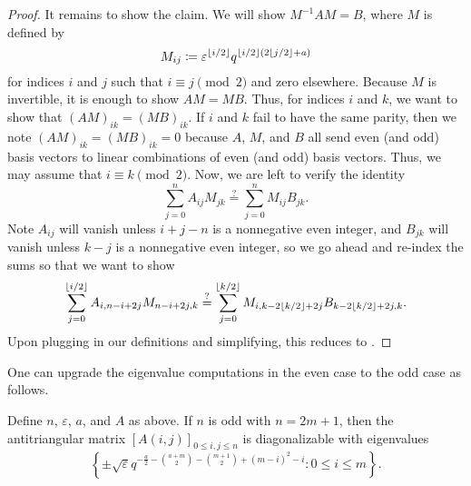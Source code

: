 \begin{proof}
    It remains to show the claim. We will show $M^{-1}AM=B$, where $M$ is defined by
    \[M_{ij}\coloneqq\varepsilon^{\left\lfloor{i/2}\right\rfloor}q^{\left\lfloor{i/2}\right\rfloor(2\left\lfloor{j/2}\right\rfloor+a)}\]
    for indices $i$ and $j$ such that $i\equiv j\pmod2$ and zero elsewhere. Because $M$ is invertible, it is enough to show $AM=MB$. Thus, for indices $i$ and $k$, we want to show that $(AM)_{ik}=(MB)_{ik}$. 
    If $i$ and $k$ fail to have the same parity, then we note $(AM)_{ik}=(MB)_{ik}=0$ because $A$, $M$, and $B$ all send even (and odd) basis vectors to linear combinations of even (and odd) basis vectors. Thus, we may assume that $i\equiv k\pmod2$. Now, we are left to verify the identity
    \[\sum_{j=0}^nA_{ij}M_{jk}\stackrel?=\sum_{j=0}^nM_{ij}B_{jk}.\]
    Note $A_{ij}$ will vanish unless $i+j-n$ is a nonnegative even integer, and $B_{jk}$ will vanish unless $k-j$ is a nonnegative even integer, so we go ahead and re-index the sums so that we want to show
    \[\sum_{j=0}^{\left\lfloor{i/2}\right\rfloor}A_{i,n-i+2j}M_{n-i+2j,k}\stackrel?=\sum_{j=0}^{\left\lfloor{k/2}\right\rfloor}M_{i,k-2\left\lfloor{k/2}\right\rfloor+2j}B_{k-2\left\lfloor{k/2}\right\rfloor+2j,k}.\]
    Upon plugging in our definitions and simplifying, this reduces to .
\end{proof}
One can upgrade the eigenvalue computations in the even case to the odd case as follows.
\begin{proposition} \label{prop:helper-matrix-odd}
    Define $n$, $\varepsilon$, $a$, and $A$ as above. If $n$ is odd with $n=2m+1$, then the antitriangular matrix $[A(i,j)]_{0\le i,j\le n}$ is diagonalizable with eigenvalues
    \[\left\{\pm\sqrt\varepsilon q^{-\frac a2-\binom{a+m}2-\binom{m+1}2+(m-i)^2-i}:0\le i\le m\right\}.\]
\end{proposition}
